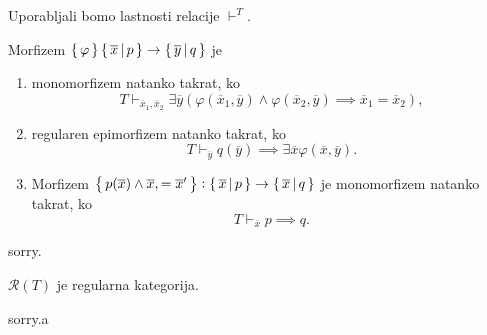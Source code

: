 \documentclass[../kategoricna_logika.tex]{subfiles}
\begin{document}
\begin{dokaz}
  Uporabljali bomo lastnosti relacije $\vdash^T$.
\end{dokaz}
\begin{lema}
  Morfizem $\left\lbrace\,\varphi\,\right\rbrace \left\lbrace\,\overline{x}\,\middle|\, p\,\right\rbrace \to \left\lbrace\,\overline{y}\,\middle|\, q\,\right\rbrace$ je
  \begin{enumerate}[label=(\roman*)]
    \item monomorfizem natanko takrat, ko
      $$T \vdash_{\overline{x}_1,\overline{x}_2}  \exists \overline{y} \left( \varphi(\overline{x}_1,\overline{y}) \wedge \varphi(\overline{x}_2,\overline{y}) \implies \overline{x}_1 = \overline{x}_2 \right),$$
    \item regularen epimorfizem natanko takrat, ko
      $$T \vdash_{\overline{y}} q(\overline{y}) \implies \exists \overline{x} \varphi(\overline{x},\overline{y}).$$
    \item Morfizem $\left\lbrace\,p(\overline{x}) \wedge \overline{x}, = \overline{x}'\,\right\rbrace : \left\lbrace\,\overline{x}\,\middle|\, p \,\right\rbrace \to \left\lbrace\,\overline{x}\,\middle|\, q\,\right\rbrace$ je monomorfizem natanko takrat, ko
      $$T \vdash_{\overline{x}} p \implies q.$$
  \end{enumerate}
\end{lema}
\begin{dokaz}
  sorry.
\end{dokaz}
\begin{trditev}
  $\mathcal{R}(T)$ je regularna kategorija.
\end{trditev}
\begin{dokaz}
  sorry.a
\end{dokaz}
\end{document}
